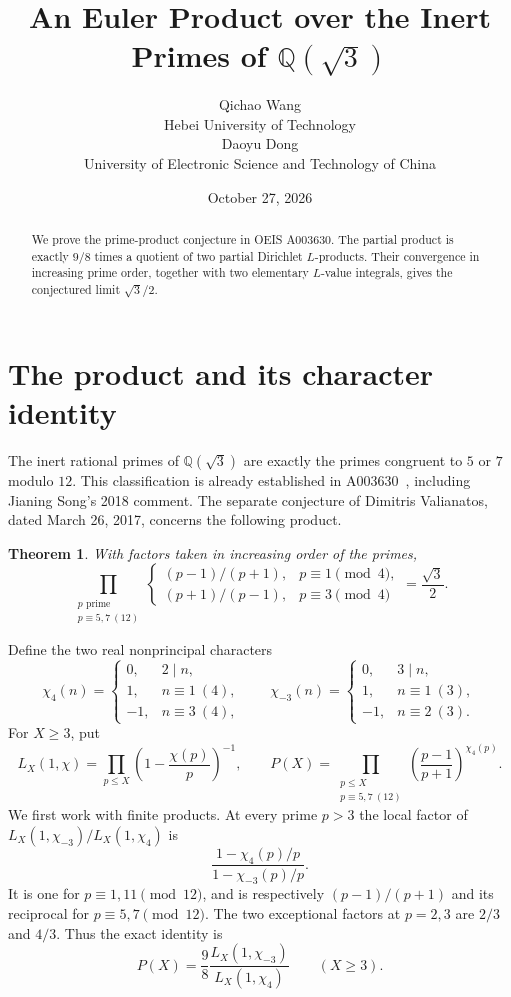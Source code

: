 \documentclass[10pt]{article}
\title{An Euler Product over the Inert Primes of $\mathbb Q(\sqrt3)$}
\author{Qichao Wang\\{\small Hebei University of Technology}\\[.3em]
Daoyu Dong\\{\small University of Electronic Science and Technology of China}}
\date{October 27, 2026}
\newtheorem{theorem}{Theorem}
\begin{document}
\maketitle
\begin{abstract}
We prove the prime-product conjecture in OEIS A003630. The partial
product is exactly $9/8$ times a quotient of two partial Dirichlet
$L$-products. Their convergence in increasing prime order, together
with two elementary $L$-value integrals, gives the conjectured limit
$\sqrt3/2$.
\end{abstract}

\section{The product and its character identity}
The inert rational primes of $\mathbb Q(\sqrt3)$ are exactly the
primes congruent to $5$ or $7$ modulo $12$. This classification is
already established in A003630~\cite{oeis}, including Jianing Song's 2018
comment. The separate conjecture of Dimitris Valianatos, dated
March 26, 2017, concerns the following product.

\begin{theorem}\label{thm:main}
With factors taken in increasing order of the primes,
\[
 \prod_{\substack{p\text{ prime}\\p\equiv5,7\ (12)}}
 \begin{cases}
 (p-1)/(p+1),&p\equiv1\pmod4,\\
 (p+1)/(p-1),&p\equiv3\pmod4
 \end{cases}
 =\frac{\sqrt3}{2}.
\]
\end{theorem}

Define the two real nonprincipal characters
\[
 \chi_4(n)=\begin{cases}0,&2\mid n,\\1,&n\equiv1\ (4),\\-1,&n\equiv3\ (4),\end{cases}
 \qquad
 \chi_{-3}(n)=\begin{cases}0,&3\mid n,\\1,&n\equiv1\ (3),\\-1,&n\equiv2\ (3).\end{cases}
\]
For $X\ge3$, put
\[
 L_X(1,\chi)=\prod_{p\le X}\left(1-\frac{\chi(p)}p\right)^{-1},
 \qquad
 P(X)=\prod_{\substack{p\le X\\p\equiv5,7\ (12)}}
 \left(\frac{p-1}{p+1}\right)^{\chi_4(p)}.
\]
We first work with finite products. At every prime $p>3$ the local
factor of $L_X(1,\chi_{-3})/L_X(1,\chi_4)$ is
\[
 \frac{1-\chi_4(p)/p}{1-\chi_{-3}(p)/p}.
\]
It is one for $p\equiv1,11\pmod{12}$, and is respectively
$(p-1)/(p+1)$ and its reciprocal for $p\equiv5,7\pmod{12}$.
The two exceptional factors at $p=2,3$ are $2/3$ and $4/3$.
Thus the exact identity is
\begin{equation}\label{eq:finite}
 P(X)=\frac98\frac{L_X(1,\chi_{-3})}{L_X(1,\chi_4)}
 \qquad(X\ge3).
\end{equation}
\end{document}
